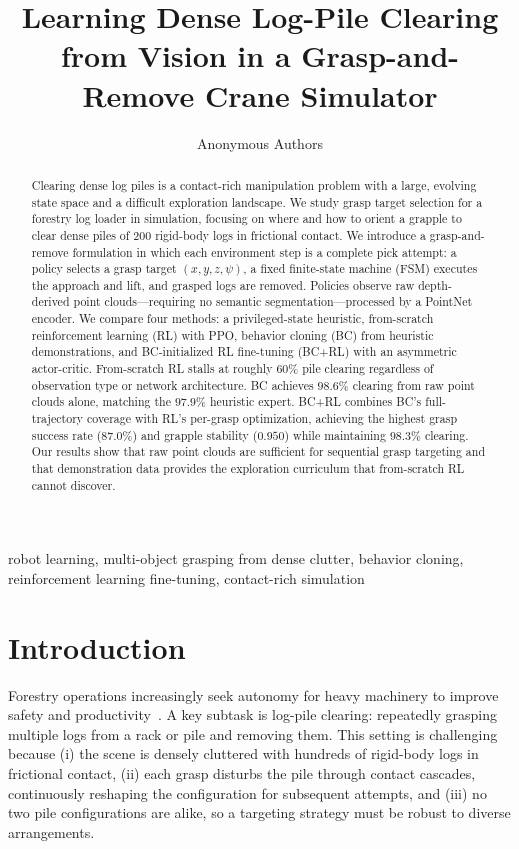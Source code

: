 \documentclass[conference]{IEEEtran}
\title{Learning Dense Log-Pile Clearing from Vision in a Grasp-and-Remove Crane Simulator}
\author{
Anonymous Authors
}
\begin{document}
\maketitle

\begin{abstract}
Clearing dense log piles is a contact-rich manipulation problem with a large, evolving state space and a difficult exploration landscape.
We study grasp target selection for a forestry log loader in simulation, focusing on where and how to orient a grapple to clear dense piles of 200 rigid-body logs in frictional contact.
We introduce a grasp-and-remove formulation in which each environment step is a complete pick attempt: a policy selects a grasp target $(x,y,z,\psi)$, a fixed finite-state machine (FSM) executes the approach and lift, and grasped logs are removed.
Policies observe raw depth-derived point clouds---requiring no semantic segmentation---processed by a PointNet encoder.
We compare four methods: a privileged-state heuristic, from-scratch reinforcement learning (RL) with PPO, behavior cloning (BC) from heuristic demonstrations, and BC-initialized RL fine-tuning (BC+RL) with an asymmetric actor-critic.
From-scratch RL stalls at roughly 60\% pile clearing regardless of observation type or network architecture.
BC achieves $98.6$\% clearing from raw point clouds alone, matching the $97.9$\% heuristic expert.
BC+RL combines BC's full-trajectory coverage with RL's per-grasp optimization, achieving the highest grasp success rate ($87.0$\%) and grapple stability ($0.950$) while maintaining $98.3$\% clearing.
Our results show that raw point clouds are sufficient for sequential grasp targeting and that demonstration data provides the exploration curriculum that from-scratch RL cannot discover.
\end{abstract}

\begin{IEEEkeywords}
robot learning, multi-object grasping from dense clutter, behavior cloning, reinforcement learning fine-tuning, contact-rich simulation
\end{IEEEkeywords}

\section{Introduction}
Forestry operations increasingly seek autonomy for heavy machinery to improve safety and productivity~\cite{lindroos2015forestry}.
A key subtask is log-pile clearing: repeatedly grasping multiple logs from a rack or pile and removing them.
This setting is challenging because (i) the scene is densely cluttered with hundreds of rigid-body logs in frictional contact, (ii) each grasp disturbs the pile through contact cascades, continuously reshaping the configuration for subsequent attempts, and (iii) no two pile configurations are alike, so a targeting strategy must be robust to diverse arrangements.
\end{document}
